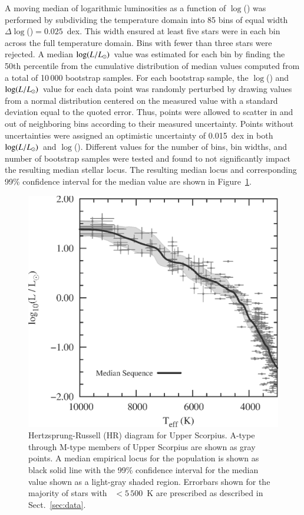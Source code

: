 \documentclass{aa}
\begin{document}
A moving median of logarithmic luminosities as a function of $\log$(\teff) was performed by subdividing the temperature domain into 85 bins of equal width $\Delta\log$(\teff)$ = 0.025$~dex. This width ensured at least five stars were in each bin across the full temperature domain. Bins with fewer than three stars were rejected. A median $\log(L/L_{\odot})$\ value was estimated for each bin by finding the 50th percentile from the cumulative distribution of median values computed from a total of 10\,000 bootstrap samples. For each bootstrap sample, the $\log$(\teff) and $\log(L/L_{\odot})$\ value for each data point was randomly perturbed by drawing values from a normal distribution centered on the measured value with a standard deviation equal to the quoted error. Thus, points were allowed to scatter in and out of neighboring bins according to their measured uncertainty. Points without uncertainties were assigned an optimistic uncertainty of 0.015~dex in both $\log(L/L_{\odot})$\ and $\log$(\teff). Different values for the number of bins, bin widths, and number of bootstrap samples were tested and found to not significantly impact the resulting median stellar locus. The resulting median locus and corresponding 99\% confidence interval for the median value are shown in Figure~\ref{fig:empirical}.

\begin{figure}[t]
    \centering
    \includegraphics[width=0.85\linewidth]{USco_median_HRD.eps}
    \caption{Hertzsprung-Russell (HR) diagram for Upper Scorpius. A-type through M-type members of Upper Scorpius \citep{Preibisch1999,Preibisch2002,Pecaut2012} are shown as gray points. A median empirical locus for the population is shown as black solid line with the 99\% confidence interval for the median value shown as a light-gray shaded region. Errorbars shown for the majority of stars with \teff~$< 5\,500$~K are prescribed as described in Sect.~\ref{sec:data}.}
    \label{fig:empirical}
\end{figure}
\end{document}
